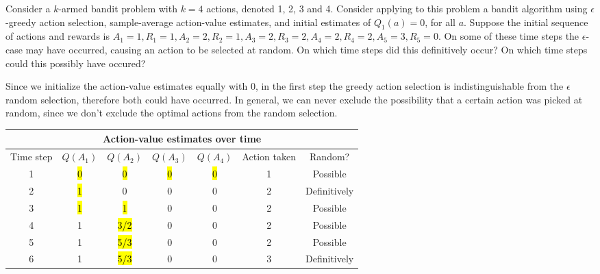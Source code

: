 
\begin{exercise}

Consider a $k$-armed bandit problem with $k = 4$ actions, denoted 1, 2, 3 and 4.
Consider applying to this problem a bandit algorithm using $\epsilon$-greedy action
selection, sample-average action-value estimates, and initial estimates of $Q_1(a) = 0$, for all $a$.
Suppose the initial sequence of actions and rewards is $A_1 = 1, R_1 = 1, A_2 = 2, R_2 = 1,
A_3 = 2, R_3 = 2, A_4 = 2, R_4 = 2, A_5 = 3, R_5 = 0$. On some of these time steps
the $\epsilon$-case may have occurred, causing an action to be selected at random.
On which time steps did this definitively occur? On which time steps could this possibly
have occured?

\end{exercise}


\begin{solution}

Since we initialize the action-value estimates equally with $0$, in the first
step the greedy action selection is indistinguishable from the $\epsilon$ random selection,
therefore both could have occurred.
In general, we can never exclude the possibility that a certain action was picked
at random, since we don't exclude the optimal actions from the random selection.


\begin{center}
\begin{tabular}{ |c||c|c|c|c|c|c| }
 \hline
 \multicolumn{7}{|c|}{Action-value estimates over time} \\
 \hline
 Time step & $Q(A_1)$ & $Q(A_2)$ & $Q(A_3)$ & $Q(A_4)$ & Action taken & Random?\\
 \hline
 1 & \hl{0} & \hl{0} & \hl{0} & \hl{0} & 1 & Possible \\
 2 & \hl{1} & 0 & 0 & 0 & 2 & Definitively\\
 3 & \hl{1} & \hl{1} & 0 & 0 & 2 & Possible \\
 4 & 1 & \hl{3/2} & 0 & 0 & 2 & Possible\\
 5 & 1 & \hl{5/3} & 0 & 0 & 2 & Possible\\
 6 & 1 & \hl{5/3} & 0 & 0 & 3 & Definitively\\
 \hline
\end{tabular}
\end{center}


\end{solution}

